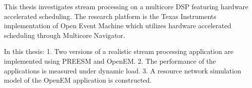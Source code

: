 This thesis investigates stream processing on a multicore DSP featuring hardware accelerated scheduling. The research platform is the Texas Instruments implementation of Open Event Machine which utilizes hardware accelerated scheduling through Multicore Navigator.

In this thesis: 1. Two versions of a realistic stream processing application are implemented using PREESM and OpenEM. 2. The performance of the applications is measured under dynamic load. 3. A resource network simulation model of the OpenEM application is constructed. 